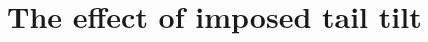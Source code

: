 \documentclass{article}
\begin{document}
  \clearpage
% 

  \section{The effect of imposed tail tilt}\label{section:tail_tilt}
  
\end{document}

